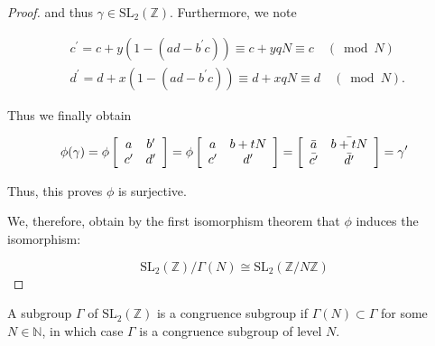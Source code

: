 \begin{proposition}
\begin{proof}
and thus $\gamma \in \mathrm{SL}_{2}(\mathbb{Z})$. Furthermore, we note

$$
\begin{aligned}
& c^{\prime}=c+y\left(1-\left(a d-b^{\prime} c\right)\right) \equiv c+y q N \equiv c \quad(\bmod N) \\
& d^{\prime}=d+x\left(1-\left(a d-b^{\prime} c\right)\right) \equiv d+x q N \equiv d \quad(\bmod N) \text {. }
\end{aligned}
$$

Thus we finally obtain

$$
\phi(\gamma)=\phi\left[\begin{array}{cc}
a & b^{\prime} \\
c^{\prime} & d^{\prime}
\end{array}\right]=\phi\left[\begin{array}{cc}
a & b+t N \\
c^{\prime} & d^{\prime}
\end{array}\right]=\left[\begin{array}{cc}
{\Bar{a}} & {\Bar{b+tN}} \\
{\Bar{c^{\prime}}} & {\Bar{d^{\prime}}}
\end{array}\right]=\gamma'
$$

Thus, this proves $\phi$ is surjective.

We, therefore, obtain by the first isomorphism theorem that $\phi$ induces the isomorphism:

$$
\mathrm{SL}_{2}(\mathbb{Z}) / \Gamma(N) \cong \mathrm{SL}_{2}(\mathbb{Z} / N \mathbb{Z})
$$

\end{proof}
\end{proposition}
\begin{definition}
    A subgroup $\Gamma$ of $\mathrm{SL}_{2}(\mathbb{Z})$ is a congruence subgroup if $\Gamma(N) \subset \Gamma$ for some $N \in \mathbb{N}$, in which case $\Gamma$ is a congruence subgroup of level $N$.

\end{definition}
